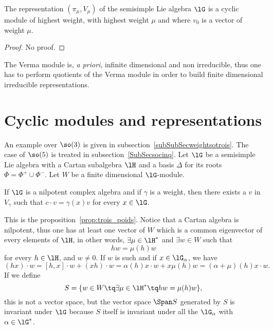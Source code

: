 \begin{theorem}
The representation $(\pi_{\mu},V_{\mu})$ of the semisimple Lie algebra $\lG$ is a cyclic module of highest weight, with highest weight $\mu$ and where $v_0$ is a vector of weight $\mu$.
\end{theorem}
\begin{proof}
    No proof.
\end{proof}
The Verma module is, \emph{a priori}, infinite dimensional and non irreducible, thus one has to perform quotients of the Verma module in order to build finite dimensional irreducible representations.
                    \section{Cyclic modules and representations}

An example over $\so(3)$ is given in subsection~\ref{subSubSecweightsotrois}. The case of $\so(5)$ is treated in subsection~\ref{SubSecsocinq}. Let $\lG$ be a semisimple Lie algebra with a Cartan subalgebra $\lH$ and a basis $\Delta$ for its roots $\Phi=\Phi^+\cup\Phi^-$. Let $W$ be a finite dimensional $\lG$-module.

\begin{lemma}
If $\lG$ is a nilpotent complex algebra and if $\gamma$ is a weight, then there exists a $v$ in $V_{\gamma}$ such that $c\cdot v=\gamma(x)v$ for every $x\in\lG$.
\end{lemma}
This is the proposition~\ref{prop:trois_poids}. Notice that a Cartan algebra is nilpotent, thus one has at least one vector of $W$ which is a common eigenvector of every elements of $\lH$, in other words, $\exists\mu\in\lH^*$ and $\exists w\in W$ such that
\begin{equation}
    hw=\mu(h)w
\end{equation}
for every $h\in\lH$, and $w\neq 0$. If $w$ is such and if $x\in\lG_{\alpha}$, we have
\begin{equation}
    (hx)\cdot w=[h,x]\cdot w+(xh)\cdot w=\alpha(h)x\cdot w+x\mu(h)w=(\alpha+\mu)(h)x\cdot w.
\end{equation}
If we define
\begin{equation}
    S=\{ w\in W\tq\exists\mu\in\lH^*\tq hw=\mu(h)w \},
\end{equation}
this is not a vector space, but the vector space $\Span S$ generated by $S$ is invariant under $\lG$ because $S$ itself is invariant under all the $\lG_{\alpha}$ with $\alpha\in\lG^*$.

